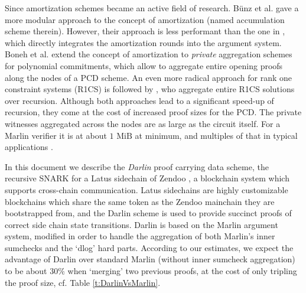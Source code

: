 \documentclass[10pt,article,oneside]{memoir}
\theoremstyle{definition}
\theoremstyle{remark}
\begin{document}
Since \cite{Halo} amortization schemes became an active field of research.
B\"unz et al. \cite{Buenz} gave a more modular approach to the \cite{Halo} concept of amortization (named accumulation scheme therein).
However, their approach is less performant than the one in \cite{Halo}, which directly integrates the amortization rounds into the argument system.
Boneh et al. \cite{HaloInfinite} extend the concept of amortization to \textit{private} aggregation schemes for polynomial commitments, which allow to aggregate entire opening proofs along the nodes of a PCD scheme.
An even more radical approach for rank one constraint systems (R1CS) is followed by  \cite{PrivateAggregationR1CS}, who aggregate entire R1CS solutions over recursion.
Although both approaches lead to a significant speed-up of recursion, they come at the cost of increased proof sizes for the PCD.
The private witnesses aggregated across the nodes are as large as the circuit itself. 
For a Marlin verifier it is at about $1 \text{ MiB}$ at minimum, and multiples of that in typical applications \cite{PrivateAggregationR1CS}.


\medskip
In this document we describe the \textit{Darlin} proof carrying data scheme, the recursive SNARK for a Latus sidechain of Zendoo \cite{Zendoo}, a blockchain system which supports cross-chain communication. 
Latus sidechains are highly customizable blockchains which share the same token as the Zendoo mainchain they are bootstrapped from, and the Darlin scheme is used to provide succinct proofs of correct side chain state transitions.
Darlin is based on the Marlin argument system, modified in order to handle the aggregation of both Marlin's inner sumchecks and the `dlog' hard parts. 
According to our estimates, we expect the advantage of Darlin over standard Marlin (without inner sumcheck aggregation) to be about $30\%$ when `merging' two previous proofs, at the cost of only tripling the proof size, cf. Table \ref{t:DarlinVsMarlin}. 
\end{document}
